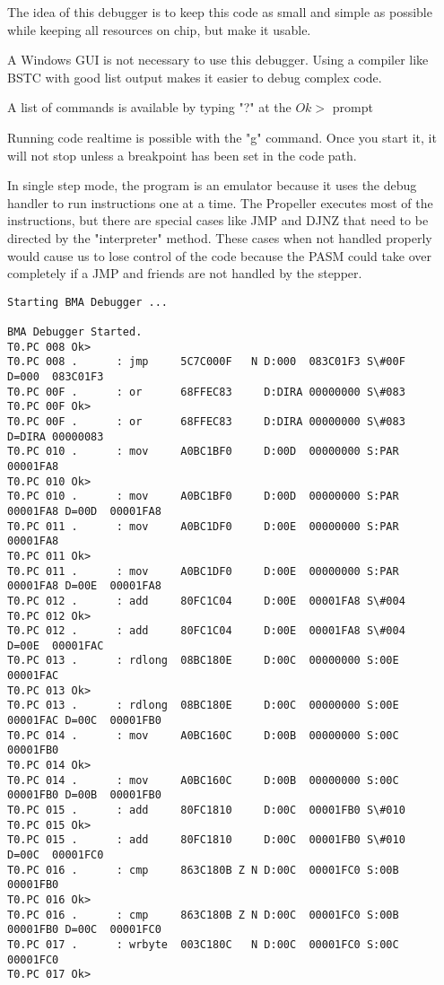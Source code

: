 \documentclass{article}
\numberwithin{equation}{section} %
\begin{document}
The idea of this debugger is to keep this code as small and simple as possible
while keeping all resources on chip, but make it usable.

A Windows GUI is not necessary to use this debugger. Using a compiler like BSTC
with good list output makes it easier to debug complex code.

A list of commands is available by typing "?" at the $Ok>$ prompt 

Running code realtime is possible with the "g" command. Once you start it,
it will not stop unless a breakpoint has been set in the code path.
 
In single step mode, the program is an emulator because it uses the debug
handler to run instructions one at a time. The Propeller executes most of the
instructions, but there are special cases like JMP and DJNZ that need to be
directed by the "interpreter" method. These cases when not handled properly
would cause us to lose control of the code because the PASM could take over
completely if a JMP and friends are not handled by the stepper.

\begin{lstlisting}
Starting BMA Debugger ...

BMA Debugger Started.
T0.PC 008 Ok>
T0.PC 008 .      : jmp     5C7C000F   N D:000  083C01F3 S\#00F           D=000  083C01F3
T0.PC 00F .      : or      68FFEC83     D:DIRA 00000000 S\#083
T0.PC 00F Ok>
T0.PC 00F .      : or      68FFEC83     D:DIRA 00000000 S\#083           D=DIRA 00000083
T0.PC 010 .      : mov     A0BC1BF0     D:00D  00000000 S:PAR  00001FA8
T0.PC 010 Ok>
T0.PC 010 .      : mov     A0BC1BF0     D:00D  00000000 S:PAR  00001FA8 D=00D  00001FA8
T0.PC 011 .      : mov     A0BC1DF0     D:00E  00000000 S:PAR  00001FA8
T0.PC 011 Ok>
T0.PC 011 .      : mov     A0BC1DF0     D:00E  00000000 S:PAR  00001FA8 D=00E  00001FA8
T0.PC 012 .      : add     80FC1C04     D:00E  00001FA8 S\#004
T0.PC 012 Ok>
T0.PC 012 .      : add     80FC1C04     D:00E  00001FA8 S\#004           D=00E  00001FAC
T0.PC 013 .      : rdlong  08BC180E     D:00C  00000000 S:00E  00001FAC
T0.PC 013 Ok>
T0.PC 013 .      : rdlong  08BC180E     D:00C  00000000 S:00E  00001FAC D=00C  00001FB0
T0.PC 014 .      : mov     A0BC160C     D:00B  00000000 S:00C  00001FB0
T0.PC 014 Ok>
T0.PC 014 .      : mov     A0BC160C     D:00B  00000000 S:00C  00001FB0 D=00B  00001FB0
T0.PC 015 .      : add     80FC1810     D:00C  00001FB0 S\#010
T0.PC 015 Ok>
T0.PC 015 .      : add     80FC1810     D:00C  00001FB0 S\#010           D=00C  00001FC0
T0.PC 016 .      : cmp     863C180B Z N D:00C  00001FC0 S:00B  00001FB0
T0.PC 016 Ok>
T0.PC 016 .      : cmp     863C180B Z N D:00C  00001FC0 S:00B  00001FB0 D=00C  00001FC0
T0.PC 017 .      : wrbyte  003C180C   N D:00C  00001FC0 S:00C  00001FC0
T0.PC 017 Ok>
\end{lstlisting}
\end{document}
